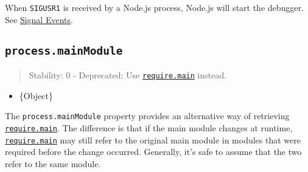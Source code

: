 \begin{Shaded}
\begin{Highlighting}[]
  \OperatorTok{=} \NormalTok{(}\NormalTok{)}\OperatorTok{;}

\NormalTok{(}\OperatorTok{,}\NormalTok{ () }\KeywordTok{=\textgreater{}}\NormalTok{ \{}
  \NormalTok{(}\NormalTok{)}\OperatorTok{;}
\NormalTok{\})}\OperatorTok{;}

\NormalTok{(() }\KeywordTok{=\textgreater{}}\NormalTok{ \{}
  \NormalTok{(}\NormalTok{)}\OperatorTok{;}
  \NormalTok{(}\NormalTok{)}\OperatorTok{;}
\NormalTok{\}}\OperatorTok{,} \NormalTok{)}\OperatorTok{;}

\NormalTok{(}\OperatorTok{,} \NormalTok{)}\OperatorTok{;}
\end{Highlighting}
\end{Shaded}

When \texttt{SIGUSR1} is received by a Node.js process, Node.js will
start the debugger. See \hyperref[signal-events]{Signal Events}.

\subsection{\texorpdfstring{\texttt{process.mainModule}}{process.mainModule}}\label{process.mainmodule}

\begin{quote}
Stability: 0 - Deprecated: Use
\href{modules.md\#accessing-the-main-module}{\texttt{require.main}}
instead.
\end{quote}

\begin{itemize}
\tightlist
\item
  \{Object\}
\end{itemize}

The \texttt{process.mainModule} property provides an alternative way of
retrieving
\href{modules.md\#accessing-the-main-module}{\texttt{require.main}}. The
difference is that if the main module changes at runtime,
\href{modules.md\#accessing-the-main-module}{\texttt{require.main}} may
still refer to the original main module in modules that were required
before the change occurred. Generally, it's safe to assume that the two
refer to the same module.

